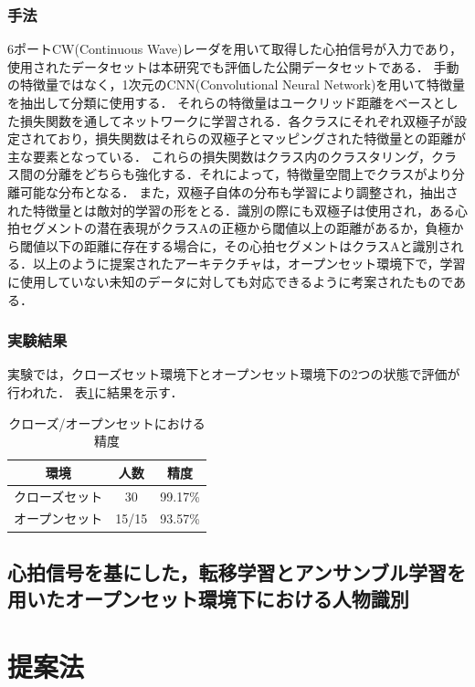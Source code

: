 \subsection{手法}
6ポートCW(Continuous Wave)レーダを用いて取得した心拍信号が入力であり，使用されたデータセットは本研究でも評価した公開データセットである．
手動の特徴量ではなく，1次元のCNN(Convolutional Neural Network)を用いて特徴量を抽出して分類に使用する．
それらの特徴量はユークリッド距離をベースとした損失関数を通してネットワークに学習される．各クラスにそれぞれ双極子が設定されており，損失関数はそれらの双極子とマッピングされた特徴量との距離が主な要素となっている．
これらの損失関数はクラス内のクラスタリング，クラス間の分離をどちらも強化する．それによって，特徴量空間上でクラスがより分離可能な分布となる．
また，双極子自体の分布も学習により調整され，抽出された特徴量とは敵対的学習の形をとる．識別の際にも双極子は使用され，ある心拍セグメントの潜在表現がクラスAの正極から閾値以上の距離があるか，負極から閾値以下の距離に存在する場合に，その心拍セグメントはクラスAと識別される．以上のように提案されたアーキテクチャは，オープンセット環境下で，学習に使用していない未知のデータに対しても対応できるように考案されたものである．

\subsection{実験結果}
実験では，クローズセット環境下とオープンセット環境下の2つの状態で評価が行われた．
表\ref{table:HeartSignature}に結果を示す．

\begin{table}[H]
\caption{クローズ/オープンセットにおける精度}
\centering
\begin{tabular}{ccc}
\hline
環境 & 人数 & 精度 \\
\hline
クローズセット & 30 & 99.17\% \\
オープンセット & 15/15 & 93.57\% \\
\hline
\end{tabular}
\label{table:HeartSignature}
\end{table}

\section{心拍信号を基にした，転移学習とアンサンブル学習を用いたオープンセット環境下における人物識別\cite{paper:Xing}}


\chapter{提案法}

